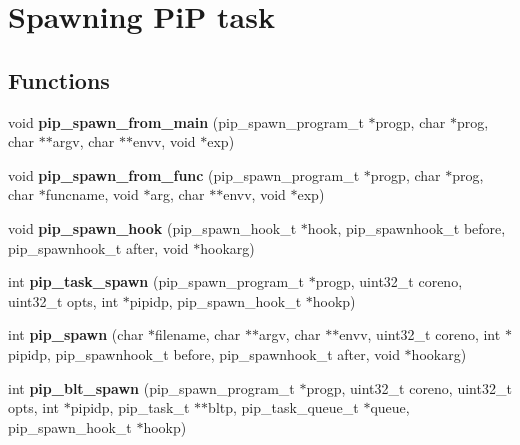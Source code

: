 \hypertarget{group__pip-1-spawn}{\section{Spawning Pi\-P task}
\label{group__pip-1-spawn}
}
\subsection*{Functions}
\begin{DoxyCompactItemize}
\item 
\hypertarget{group__pip-1-spawn_ga0b1e746befd27c418355d28a830b2db6}{void {\bfseries pip\-\_\-spawn\-\_\-from\-\_\-main} (pip\-\_\-spawn\-\_\-program\-\_\-t $\ast$progp, char $\ast$prog, char $\ast$$\ast$argv, char $\ast$$\ast$envv, void $\ast$exp)}\label{group__pip-1-spawn_ga0b1e746befd27c418355d28a830b2db6}

\item 
\hypertarget{group__pip-1-spawn_ga6ebadd5070ca345daf8d7465f4926fc0}{void {\bfseries pip\-\_\-spawn\-\_\-from\-\_\-func} (pip\-\_\-spawn\-\_\-program\-\_\-t $\ast$progp, char $\ast$prog, char $\ast$funcname, void $\ast$arg, char $\ast$$\ast$envv, void $\ast$exp)}\label{group__pip-1-spawn_ga6ebadd5070ca345daf8d7465f4926fc0}

\item 
\hypertarget{group__pip-1-spawn_ga1c3f1d9e029f68dbcfb7d78b7dfa1533}{void {\bfseries pip\-\_\-spawn\-\_\-hook} (pip\-\_\-spawn\-\_\-hook\-\_\-t $\ast$hook, pip\-\_\-spawnhook\-\_\-t before, pip\-\_\-spawnhook\-\_\-t after, void $\ast$hookarg)}\label{group__pip-1-spawn_ga1c3f1d9e029f68dbcfb7d78b7dfa1533}

\item 
\hypertarget{group__pip-1-spawn_gaf1fcc4cb85ec3eda734afe2beb0c6a36}{int {\bfseries pip\-\_\-task\-\_\-spawn} (pip\-\_\-spawn\-\_\-program\-\_\-t $\ast$progp, uint32\-\_\-t coreno, uint32\-\_\-t opts, int $\ast$pipidp, pip\-\_\-spawn\-\_\-hook\-\_\-t $\ast$hookp)}\label{group__pip-1-spawn_gaf1fcc4cb85ec3eda734afe2beb0c6a36}

\item 
\hypertarget{group__pip-1-spawn_ga4698d85283b03f0443fb0991e1119d35}{int {\bfseries pip\-\_\-spawn} (char $\ast$filename, char $\ast$$\ast$argv, char $\ast$$\ast$envv, uint32\-\_\-t coreno, int $\ast$pipidp, pip\-\_\-spawnhook\-\_\-t before, pip\-\_\-spawnhook\-\_\-t after, void $\ast$hookarg)}\label{group__pip-1-spawn_ga4698d85283b03f0443fb0991e1119d35}

\item 
\hypertarget{group__pip-1-spawn_ga8b31bc23b6e165ae50d3bdea655539c5}{int {\bfseries pip\-\_\-blt\-\_\-spawn} (pip\-\_\-spawn\-\_\-program\-\_\-t $\ast$progp, uint32\-\_\-t coreno, uint32\-\_\-t opts, int $\ast$pipidp, pip\-\_\-task\-\_\-t $\ast$$\ast$bltp, pip\-\_\-task\-\_\-queue\-\_\-t $\ast$queue, pip\-\_\-spawn\-\_\-hook\-\_\-t $\ast$hookp)}\label{group__pip-1-spawn_ga8b31bc23b6e165ae50d3bdea655539c5}

\end{DoxyCompactItemize}


